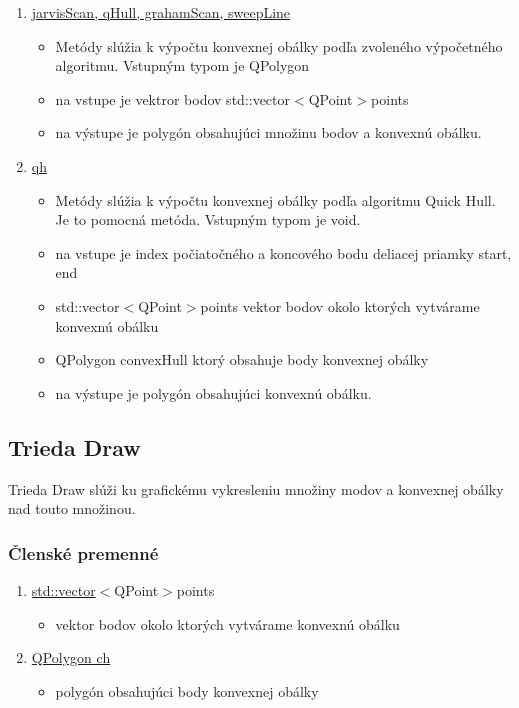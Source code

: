 \documentclass[12pt]{article}
\begin{document}
\begin{enumerate}
\item[] \underline{jarvisScan, qHull, grahamScan, sweepLine}
\begin{itemize}
\item Metódy slúžia k výpočtu konvexnej obálky podľa zvoleného výpočetného algoritmu. Vstupným typom je QPolygon
\item na vstupe je vektror bodov {std::vector}$<${QPoint}$>${points}
\item na výstupe je polygón obsahujúci množinu bodov a konvexnú obálku.
\end{itemize}

\item[] \underline{qh}
\begin{itemize}
\item Metódy slúžia k výpočtu konvexnej obálky podľa algoritmu Quick Hull. Je to pomocná metóda. Vstupným typom je void.
\item na vstupe je index počiatočného a koncového bodu deliacej priamky start, end
\item \hspace {1.5cm}  {std::vector}$<${QPoint}$>${points} vektor bodov okolo ktorých vytvárame konvexnú obálku
\item \hspace {1.5cm} QPolygon  convexHull ktorý obsahuje body konvexnej obálky
\item na výstupe je polygón obsahujúci konvexnú obálku.
\end{itemize}

\end{enumerate}

\subsection{Trieda Draw}
Trieda Draw slúži ku grafickému vykresleniu množiny modov a konvexnej obálky nad touto množinou.

\subsubsection{Členské premenné}
\begin{enumerate}

\item[] \underline {std::vector}$<${QPoint}$>${points}
\begin{itemize}
\item vektor bodov okolo ktorých vytvárame konvexnú obálku
\end{itemize}
\item[] \underline {QPolygon ch}
\begin{itemize}
\item polygón obsahujúci body konvexnej obálky
\end{itemize}
\end{enumerate}
\end{document}
